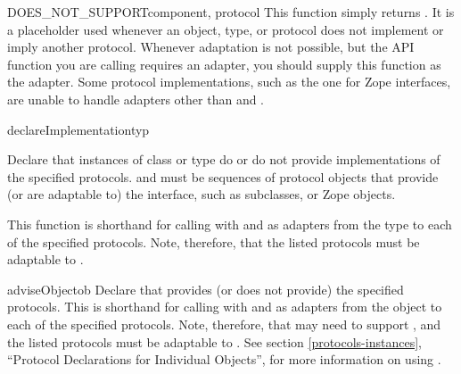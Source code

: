 \begin{verbatim%
}
\begin{verbatim%
}
\begin{verbatim%
}
\begin{verbatim%
}
\begin{funcdesc}{DOES_NOT_SUPPORT}{component, protocol}
This function simply returns .  It is a placeholder used whenever
an object, type, or protocol does not implement or imply another protocol.
Whenever adaptation is not possible, but the  API function
you are calling requires an adapter, you should supply this function as the
adapter.  Some protocol implementations, such as the one for Zope interfaces,
are unable to handle adapters other than  and
.
\end{funcdesc}

\begin{funcdesc}{declareImplementation}{typ
 }

Declare that instances of class or type  do or do not provide
implementations of the specified protocols.   and
 must be sequences of protocol objects that
provide (or are adaptable to) the  interface,
such as  subclasses, or Zope 
objects.

This function is shorthand for calling 
with  and  as adapters
from the type to each of the specified protocols.  Note, therefore, that the
listed protocols must be adaptable to .
\end{funcdesc}


\begin{funcdesc}{adviseObject}{ob
 }
Declare that  provides (or does not provide) the specified protocols.
This is shorthand for calling 
with  and  as adapters
from the object to each of the specified protocols.  Note, therefore, that
 may need to support , and the listed protocols
must be adaptable to .  See section
\ref{protocols-instances}, ``Protocol Declarations for Individual Objects'',
for more information on using .
\end{funcdesc}














\end{verbatim%
}
\end{verbatim%
}
\end{verbatim%
}
\end{verbatim%
}
